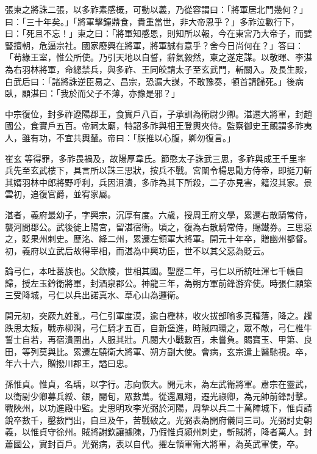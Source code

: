\begin{pinyinscope}
 張柬之將誅二張，以多祚素感概，可動以義，乃從容謂曰：「將軍居北門幾何？」曰：「三十年矣。」「將軍擊鐘鼎食，貴重當世，非大帝恩乎？」多祚泣數行下，曰：「死且不忘！」柬之曰：「將軍知感恩，則知所以報，今在東宮乃大帝子，而嬖豎擅朝，危逼宗社。國家廢興在將軍，將軍誠有意乎？舍今日尚何在？」答曰：「茍緣王室，惟公所使。乃引天地以自誓，辭氣毅然，柬之遂定謀。以敬暉、李湛為右羽林將軍，命總禁兵，與多祚、王同皎請太子至玄武門，斬關入。及長生殿，白武后曰：「諸將誅逆臣易之、昌宗，恐漏大謀，不敢豫奏，頓首請歸死。」後病臥，顧湛曰：「我於而父子不薄，亦豫是邪？」



 中宗復位，封多祚遼陽郡王，食實戶八百，子承訓為衛尉少卿。湛遷大將軍，封趙國公，食實戶五百。帝祠太廟，特詔多祚與相王登輿夾侍。監察御史王覿謂多祚夷人，雖有功，不宜共輿輦。帝曰：「朕推以心腹，卿勿復言。」



 崔玄等得罪，多祚畏禍及，故陽厚韋氏。節愍太子誅武三思，多祚與成王千里率兵先至玄武樓下，具言所以誅三思狀，按兵不戰。宮闈令楊思勖方侍帝，即挺刀斬其婿羽林中郎將野呼利，兵因沮潰，多祚為其下所殺，二子亦見害，籍沒其家。景雲初，追復官爵，並宥家屬。



 湛者，義府最幼子，字興宗，沉厚有度。六歲，授周王府文學，累遷右散騎常侍，襲河間郡公。武後徙上陽宮，留湛宿衛。頃之，復為右散騎常侍，賜鐵券。三思惡之，貶果州刺史。歷洺、絳二州，累遷左領軍大將軍。開元十年卒，贈幽州都督。初，義府以立武后故得宰相，而湛為中興功臣，世不以其父惡為貶云。



 論弓仁，本吐蕃族也。父欽陵，世相其國。聖歷二年，弓仁以所統吐渾七千帳自歸，授左玉鈐衛將軍，封酒泉郡公。神龍三年，為朔方軍前鋒游弈使。時張仁願築三受降城，弓仁以兵出諾真水、草心山為邏衛。



 開元初，突厥九姓亂，弓仁引軍度漠，逾白檉林，收火拔部喻多真種落，降之。趯跌思太叛，戰赤柳澗，弓仁騎才五百，自新堡進，時賊四環之，眾不敵，弓仁椎牛誓士自若，再宿潰圍出，人服其壯。凡閱大小戰數百，未嘗負。賜寶玉、甲第、良田，等列莫與比。累遷左驍衛大將軍、朔方副大使。會病，玄宗遣上醫馳視。卒，年六十六，贈撥川郡王，謚曰忠。



 孫惟貞。惟貞，名瑀，以字行。志向恢大。開元末，為左武衛將軍。肅宗在靈武，以衛尉少卿募兵綏、銀，閱旬，眾數萬。從還鳳翔，遷光祿卿，為元帥前鋒討擊。戰陜州，以功進殿中監。史思明攻李光弼於河陽，周摯以兵二十萬陣城下，惟貞請銳卒數千，鑿數門出，自旦及午，苦戰破之。光弼表為開府儀同三司。光弼討史朝義，以惟貞守徐州。賊將謝欽讓據陳，乃假惟貞潁州刺史，斬賊將，降者萬人。封蕭國公，實封百戶。光弼病，表以自代。擢左領軍衛大將軍，為英武軍使，卒。




\end{pinyinscope}
